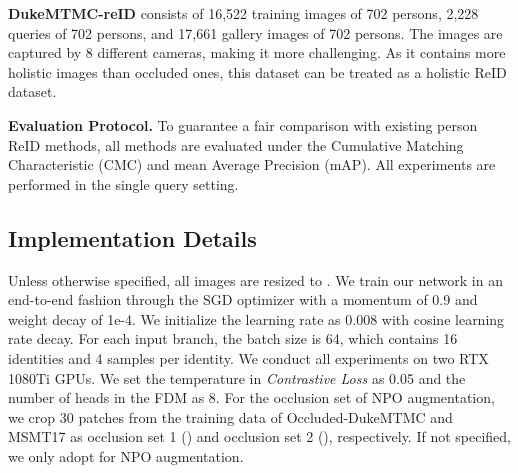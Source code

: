 \documentclass[10pt,twocolumn,letterpaper]{article}
\begin{document}
\textbf{DukeMTMC-reID} \cite{zheng2017unlabeled} consists of 16,522 training images of 702 persons, 2,228 queries of 702 persons, and 17,661 gallery images of 702 persons. The images are captured by 8 different cameras, making it more challenging. As it contains more holistic images than occluded ones, this dataset can be treated as a holistic ReID dataset.

\textbf{Evaluation Protocol.}
To guarantee a fair comparison with existing person ReID methods, all methods are evaluated under the Cumulative Matching Characteristic (CMC) and mean Average Precision (mAP). All experiments are performed in the single query setting.


\subsection{Implementation Details}
Unless otherwise specified, all images are resized to . We train our network in an end-to-end fashion through the SGD optimizer with a momentum of 0.9 and weight decay of 1e-4. We initialize the learning rate as 0.008 with cosine learning rate decay. For each input branch, the batch size is 64, which contains 16 identities and 4 samples per identity. We conduct all experiments on two RTX 1080Ti GPUs. We set the temperature  in \emph{Contrastive Loss} as 0.05 and the number of heads in the FDM as 8. 
For the occlusion set of NPO augmentation, we crop 30 patches from the training data of Occluded-DukeMTMC and MSMT17 \cite{wei2018person} as occlusion set 1 () and occlusion set 2 (), respectively. If not specified, we only adopt  for NPO augmentation. 
\end{document}
